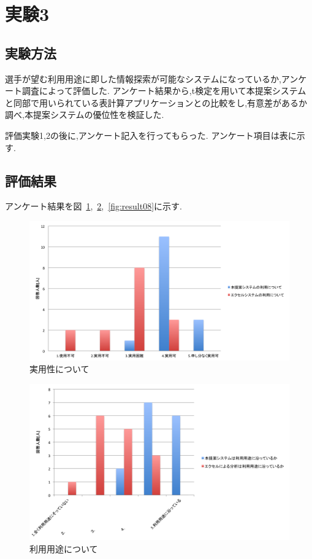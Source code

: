 \documentclass[sotsuron]{kuee}
\begin{document}
	\section{実験3}
		\subsection{実験方法}
			選手が望む利用用途に即した情報探索が可能なシステムになっているか,アンケート調査によって評価した. 
			アンケート結果から,t検定を用いて本提案システムと同部で用いられている表計算アプリケーションとの比較をし,有意差があるか調べ,本提案システムの優位性を検証した. 
			
			評価実験1,2の後に,アンケート記入を行ってもらった. 
			アンケート項目は表に示す. 
		\subsection{評価結果}
		アンケート結果を図~\ref{fig:result06},~\ref{fig:result07},~\ref{fig:result08}に示す. 
			\begin{figure}
				\begin{center}
					\includegraphics[width=\linewidth]{./png/result06.png}
				\end{center}
				\caption{実用性について}
		  		\label{fig:result06}
			\end{figure}
			\begin{figure}
				\begin{center}
					\includegraphics[width=\linewidth]{./png/result07.png}
				\end{center}
				\caption{利用用途について}
		  		\label{fig:result07}
			\end{figure}
\end{document}
